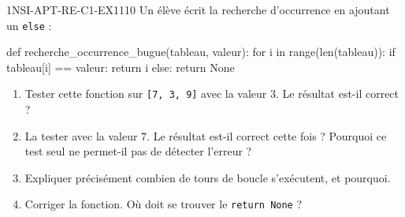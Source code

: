 

\begin{exercice}{1NSI-APT-RE-C1-EX1}{1}{10}
Un élève écrit la recherche d'occurrence en ajoutant un \lstinline{else} :
\begin{python}
def recherche_occurrence_bugue(tableau, valeur):
    for i in range(len(tableau)):
        if tableau[i] == valeur:
            return i
        else:
            return None
\end{python}
\begin{enumerate}
  \item Tester cette fonction sur \lstinline{[7, 3, 9]} avec la valeur $3$. Le résultat
    est-il correct ?
  \item La tester avec la valeur $7$. Le résultat est-il correct cette fois ? Pourquoi ce
    test seul ne permet-il pas de détecter l'erreur ?
  \item Expliquer précisément combien de tours de boucle s'exécutent, et pourquoi.
  \item Corriger la fonction. Où doit se trouver le \lstinline{return None} ?
\end{enumerate}
\end{exercice}

